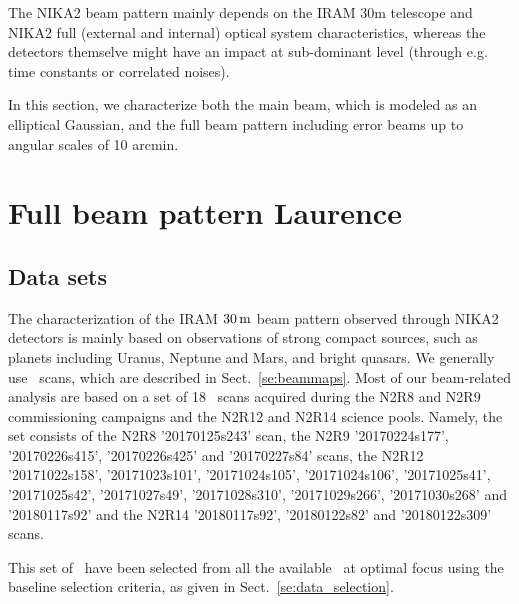 

The NIKA2 beam pattern mainly depends on the IRAM 30m telescope and
NIKA2 full (external and internal) optical system characteristics,
whereas the detectors themselve might have an impact at sub-dominant
level (through e.g. time constants or correlated noises).

In this section, we characterize both the main beam, which is
modeled as an elliptical Gaussian, and the full beam pattern including
error beams up to angular scales of 10 arcmin.

\section{Full beam pattern {\color{YellowGreen} Laurence}}
\label{se:fullbeam}

\subsection{Data sets}
\label{se:beammap_set}

The characterization of the IRAM $30\,\rm{m}$ beam pattern observed
through NIKA2 detectors is mainly based on observations of strong
compact sources, such as planets including Uranus, Neptune and Mars,
and bright quasars. We generally use \bm\ scans, which are described
in Sect.~\ref{se:beammaps}.
Most of our beam-related analysis are based on a
set of 18 \bm\ scans acquired during the N2R8 and N2R9 commissioning
campaigns and the N2R12 and N2R14 science pools. Namely, the set
consists of the N2R8 '20170125s243' scan, the N2R9 '20170224s177',
'20170226s415', '20170226s425' and '20170227s84' scans, the N2R12
'20171022s158', '20171023s101', '20171024s105', '20171024s106',
'20171025s41', '20171025s42',  '20171027s49',  '20171028s310',
'20171029s266', '20171030s268' and  '20180117s92' and the N2R14
'20180117s92',  '20180122s82' and  '20180122s309' scans.

This set of \bm\ have been selected from all the available \bm\ at
optimal focus using the baseline selection criteria, as given in
Sect.~\ref{se:data_selection}.



